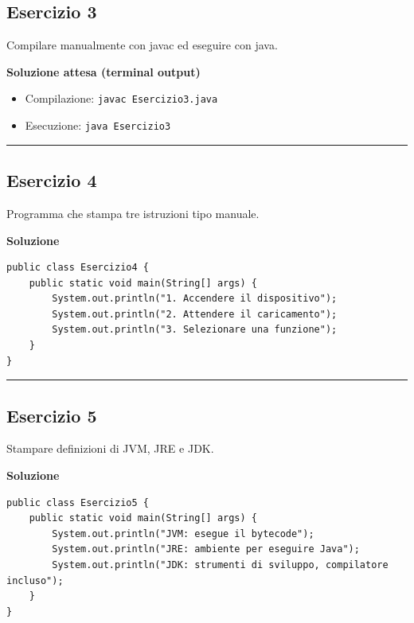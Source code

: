 \documentclass[
]{article}
\providecommand{\tightlist}{%
  \setlength{\itemsep}{0pt}\setlength{\parskip}{0pt}}
\begin{document}
\subsection{Esercizio 3}\label{esercizio-3}

Compilare manualmente con javac ed eseguire con java.

\textbf{Soluzione attesa (terminal output)}

\begin{itemize}
\tightlist
\item
  Compilazione: \texttt{javac\ Esercizio3.java}
\item
  Esecuzione: \texttt{java\ Esercizio3}
\end{itemize}

\begin{center}\rule{0.5\linewidth}{0.5pt}\end{center}

\subsection{Esercizio 4}\label{esercizio-4}

Programma che stampa tre istruzioni tipo manuale.

\textbf{Soluzione}

\begin{verbatim}
public class Esercizio4 {
    public static void main(String[] args) {
        System.out.println("1. Accendere il dispositivo");
        System.out.println("2. Attendere il caricamento");
        System.out.println("3. Selezionare una funzione");
    }
}
\end{verbatim}

\begin{center}\rule{0.5\linewidth}{0.5pt}\end{center}

\subsection{Esercizio 5}\label{esercizio-5}

Stampare definizioni di JVM, JRE e JDK.

\textbf{Soluzione}

\begin{verbatim}
public class Esercizio5 {
    public static void main(String[] args) {
        System.out.println("JVM: esegue il bytecode");
        System.out.println("JRE: ambiente per eseguire Java");
        System.out.println("JDK: strumenti di sviluppo, compilatore incluso");
    }
}
\end{verbatim}
\end{document}
